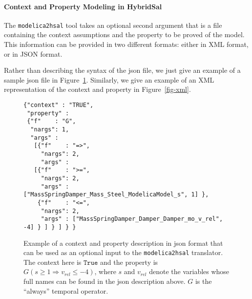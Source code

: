 \documentclass{llncs}
\begin{document}
\paragraph{Context and Property Modeling in HybridSal}

The {\tt{modelica2hsal}} tool takes an optional second argument that
is a file containing the context assumptions and the property to be proved
of the model.
This information can be provided in two different formats: either in 
XML format, or in JSON format.

Rather than describing the syntax of the json file, we just give an
example of a sample json file in Figure~\ref{fig-json}.
Similarly, we give an example of an XML representation of the
context and property in Figure~\ref{fig-xml}.

\begin{figure}[t]
\begin{tt}
\begin{verbatim}
{"context" : "TRUE",
 "property" : 
 {"f"    : "G", 
  "nargs": 1, 
  "args" : 
   [{"f"    : "=>", 
     "nargs": 2, 
     "args" : 
   [{"f"    : ">=", 
     "nargs": 2, 
     "args" : ["MassSpringDamper_Mass_Steel_ModelicaModel_s", 1] },
    {"f"    : "<=", 
     "nargs": 2, 
     "args" : ["MassSpringDamper_Damper_Damper_mo_v_rel", -4] } ] } ] } }
\end{verbatim}
\end{tt}
\caption{Example of a context and property description in json format that
can be used as an optional input to the {\tt{modelica2hsal}} translator.
The context here is $\mathtt{True}$ and the property is
$G( s \geq 1 \Rightarrow v_{rel} \leq -4 )$, where $s$ and $v_{rel}$ denote
the variables whose full names can be found in the json description above.
$G$ is the ``always'' temporal operator.}
\label{fig-json}
\end{figure}
\end{document}
